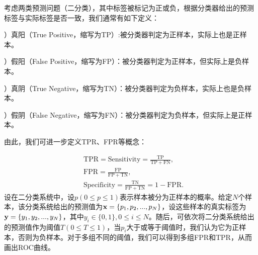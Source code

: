 考虑两类预测问题（二分类），其中标签被标记为正或负，根据分类器给出的预测标签与实际标签是否一致，我们通常有如下定义：

）真阳（True Positive，缩写为TP）:被分类器判定为正样本，实际上也是正样本。

）假阳（False Positive，缩写为FP）：被分类器判定为正样本，但实际上是负样本。

）真阴（True Negative，缩写为TN）：被分类器判定为负样本，实际上也是负样本。

）假阴（False Negative，缩写为FN）：被分类器判定为负样本，但实际上是正样本。

\noindent 由此，我们可进一步定义TPR、FPR等概念：

\vspace{-0.7cm}
\begin{align}
	&\mathrm{TPR}=\mathrm{Sensitivity}=\frac{\mathrm{TP}}{\mathrm{TP}+\mathrm{FN}},\\
	&\mathrm{FPR}=\frac{\mathrm{FP}}{\mathrm{FP}+\mathrm{TN}},\\
	&\mathrm{Specificity}=\frac{\mathrm{TN}}{\mathrm{FP}+\mathrm{TN}}=1-\mathrm{FPR}.
\end{align}
设在二分类系统中，设$p(0\leq p \leq 1)$表示样本被分为正样本的概率。给定$N$个样本，该分类系统给出的预测值为$\mathbf{x}=\{p_1,p_2,...,p_N
\}$，设这些样本的真实标签为$\mathbf{y}=\{y_1,y_2,...,y_N\}$，其中$y_i \in \{0,1\},0\leq i \le N$。随后，可依次将二分类系统给出的预测值作为阈值$T(0\leq T \leq 1)$，当$p_i$大于或等于阈值时，我们认为它为正样本，否则为负样本。对于多组不同的阈值，我们可以得到多组FPR和TPR，从而画出ROC曲线。


